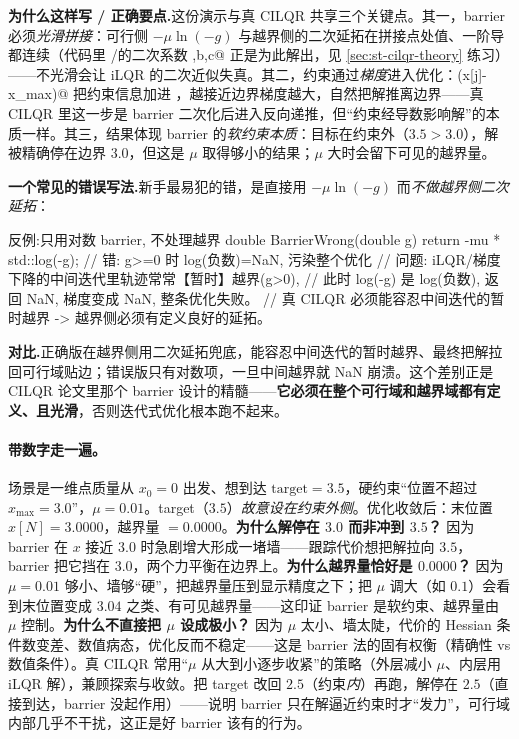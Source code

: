 \noindent\textbf{为什么这样写 / 正确要点.}\;这份演示与真 CILQR 共享三个关键点。其一，barrier 必须\emph{光滑拼接}：可行侧 $-\mu\ln(-g)$ 与越界侧的二次延拓在拼接点处值、一阶导都连续（代码里 \verb@Barrier@/\verb@BarrierGrad@ 的二次系数 \verb@a,b,c@ 正是为此解出，见 \cref{sec:st-cilqr-theory} 练习）——不光滑会让 iLQR 的二次近似失真。其二，约束通过\emph{梯度}进入优化：\verb@BarrierGrad(x[j]-x_max)@ 把约束信息加进 \verb@grad@，越接近边界梯度越大，自然把解推离边界——真 CILQR 里这一步是 barrier 二次化后进入反向递推，但“约束经导数影响解”的本质一样。其三，结果体现 barrier 的\emph{软约束本质}：目标在约束外（$3.5>3.0$），解被精确停在边界 $3.0$，但这是 $\mu$ 取得够小的结果；$\mu$ 大时会留下可见的越界量。

\noindent{}\textbf{一个常见的错误写法.}\;新手最易犯的错，是直接用 $-\mu\ln(-g)$ 而\emph{不做越界侧二次延拓}：

\begin{codebox}[C++]{反例:只用对数 barrier, 不处理越界}
double BarrierWrong(double g) {
  return -mu * std::log(-g);   // 错: g>=0 时 log(负数)=NaN, 污染整个优化
}
// 问题: iLQR/梯度下降的中间迭代里轨迹常常【暂时】越界(g>0),
//       此时 log(-g) 是 log(负数), 返回 NaN, 梯度变成 NaN, 整条优化失败。
//       真 CILQR 必须能容忍中间迭代的暂时越界 -> 越界侧必须有定义良好的延拓。
\end{codebox}

\noindent\textbf{对比.}\;正确版在越界侧用二次延拓兜底，能容忍中间迭代的暂时越界、最终把解拉回可行域贴边；错误版只有对数项，一旦中间越界就 NaN 崩溃。这个差别正是 CILQR 论文里那个 barrier 设计的精髓——\textbf{它必须在整个可行域和越界域都有定义、且光滑}，否则迭代式优化根本跑不起来。

\paragraph{带数字走一遍。}
场景是一维点质量从 $x_0=0$ 出发、想到达 $\text{target}=3.5$，硬约束“位置不超过 $x_{\max}=3.0$”，$\mu=0.01$。target（$3.5$）\emph{故意设在约束外侧}。优化收敛后：末位置 $x[N]=3.0000$，越界量 $=0.0000$。\textbf{为什么解停在 $3.0$ 而非冲到 $3.5$？} 因为 barrier 在 $x$ 接近 $3.0$ 时急剧增大形成一堵墙——跟踪代价想把解拉向 $3.5$，barrier 把它挡在 $3.0$，两个力平衡在边界上。\textbf{为什么越界量恰好是 $0.0000$？} 因为 $\mu=0.01$ 够小、墙够“硬”，把越界量压到显示精度之下；把 $\mu$ 调大（如 $0.1$）会看到末位置变成 $3.04$ 之类、有可见越界量——这印证 barrier 是软约束、越界量由 $\mu$ 控制。\textbf{为什么不直接把 $\mu$ 设成极小？} 因为 $\mu$ 太小、墙太陡，代价的 Hessian 条件数变差、数值病态，优化反而不稳定——这是 barrier 法的固有权衡（精确性 vs 数值条件）。真 CILQR 常用“$\mu$ 从大到小逐步收紧”的策略（外层减小 $\mu$、内层用 iLQR 解），兼顾探索与收敛。把 target 改回 $2.5$（约束\emph{内}）再跑，解停在 $2.5$（直接到达，barrier 没起作用）——说明 barrier 只在解逼近约束时才“发力”，可行域内部几乎不干扰，这正是好 barrier 该有的行为。

